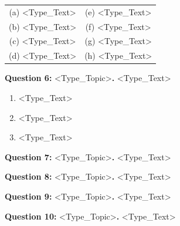 \documentclass[11pt,a4paper,twoside]{article}
\begin{document}
\quad \begin{tabular}{cc}
    (a) <Type\_Text>& \quad \quad \quad (e) <Type\_Text> \\
     (b) <Type\_Text> & \quad \quad \quad   (f) <Type\_Text>\\
      (c) <Type\_Text>& \quad \quad \quad  (g) <Type\_Text> \\
     (d) <Type\_Text> & \quad \quad \quad   (h) <Type\_Text>
\end{tabular}
\vspace{1cm}

\noindent\textbf{Question 6: }<Type\_Topic>\textbf{. }<Type\_Text>
\begin{enumerate}[1. ]
    \item <Type\_Text> 
    \begin{flushright}[< < > > Marks]\end{flushright}

    \item <Type\_Text> 
        \begin{flushright}[< < > > Marks]\end{flushright}

    \item <Type\_Text> 
        \begin{flushright}[< < > > Marks]\end{flushright}

\end{enumerate}
\begin{flushright}\end{flushright}



\noindent\textbf{Question 7: }<Type\_Topic>\textbf{. }<Type\_Text>
\begin{flushright}\end{flushright}

\noindent\textbf{Question 8: }<Type\_Topic>\textbf{. }<Type\_Text>
\begin{flushright}\end{flushright}

\noindent\textbf{Question 9: }<Type\_Topic>\textbf{. }<Type\_Text>
\begin{flushright}\end{flushright}

\noindent\textbf{Question 10: }<Type\_Topic>\textbf{. }<Type\_Text>
\begin{flushright}\end{flushright}
\end{document}
